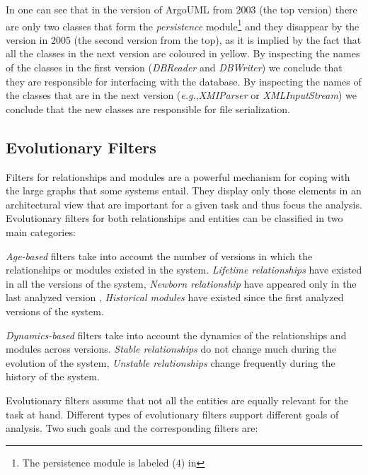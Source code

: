 \documentclass[preprint,12pt]{elsarticle}
\newcommand{\cd}[1]{{\em{#1}}}
\newcommand{\eg}{\emph{e.g.},\xspace}
\begin{document}
In  one can see that in the version of ArgoUML from 2003 (the top version) there are only two classes that form the \cd{persistence} module\footnote{The persistence module is labeled (4) in } and they disappear by the version in 2005 (the second version from the top), as it is implied by the fact that all the classes in the next version are coloured in yellow. By inspecting the names of the classes in the first version (\cd{DBReader} and \cd{DBWriter}) we conclude that they are responsible for interfacing with the database. By inspecting the names of the classes that are in the next version (\eg \cd{XMIParser} or \cd{XMLInputStream}) we conclude that the new classes are responsible for file serialization. 

\subsection {Evolutionary Filters}

Filters for relationships and modules are a powerful mechanism for coping with the large graphs that some systems entail. They display only those elements in an architectural view that are important for a given task and thus focus the analysis. Evolutionary filters for both relationships and entities can be classified in two main categories:

\begin{description}
\item {\em Age-based} filters take into account the number of versions in which the relationships or modules existed in the system. {\em Lifetime relationships} have existed in all the versions of the system, {\em Newborn relationship} have appeared only in the last analyzed version \cite{lungu-relevo}, {\em Historical modules} have existed since the first analyzed versions of the system.
\item {\em Dynamics-based} filters take into account the dynamics of the relationships and modules across versions. {\em Stable relationships} do not change much during the evolution of the system, {\em Unstable relationships} change frequently during the history of the system.
\end{description}

Evolutionary filters assume that not all the entities are equally relevant for the task at hand. Different types of evolutionary filters support different goals of analysis. Two such goals and the corresponding filters are:
\end{document}
